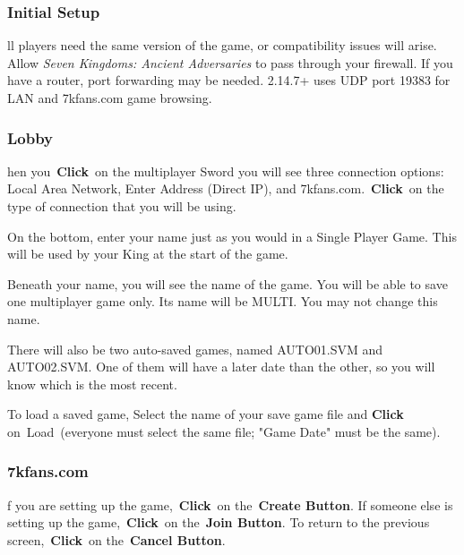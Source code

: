 \subsubsection{Initial Setup} %

ll players need the same version of the game, or compatibility issues will arise. Allow \textit{Seven Kingdoms: Ancient Adversaries} to pass through your firewall. If you have a router, port forwarding may be needed. 2.14.7+ uses UDP port 19383 for LAN and 7kfans.com game browsing.

\subsubsection{Lobby}

hen you \textbf{Click} on the multiplayer Sword you will see three connection options: Local Area Network, Enter Address (Direct IP), and 7kfans.com. \textbf{Click} on the type of connection that you will be using.

On the bottom, enter your name just as you would in a Single Player Game. This will be used by your King at the start of the game.

Beneath your name, you will see the name of the game. You will be able to save one multiplayer game only. Its name will be MULTI. You may not change this name.

There will also be two auto-saved games, named AUTO01.SVM and AUTO02.SVM. One of them will have a later date than the other, so you will know which is the most recent.

To load a saved game, Select the name of your save game file and \textbf{Click} on Load (everyone must select the same file; "Game Date" must be the same).

\subsubsection{7kfans.com}

f you are setting up the game, \textbf{Click} on the \textbf{Create Button}. If someone else is setting up the game, \textbf{Click} on the \textbf{Join Button}. To return to the previous screen, \textbf{Click} on the \textbf{Cancel Button}.

